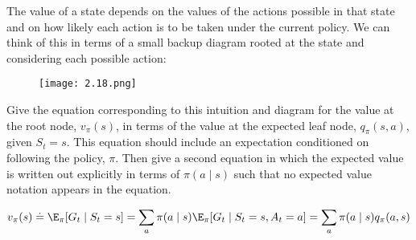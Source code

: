 
\begin{exercise}[Exercise 3.18]

The value of a state depends on the values of the actions possible in that state and on how likely each action is to be taken under the current policy.
We can think of this in terms of a small backup diagram rooted at the state and considering each possible action:

\begin{figure}[H]
    \centering
    \texttt{[image: 2.18.png]}
    \caption{}
    \label{fig:2.18}
\end{figure}

Give the equation corresponding to this intuition and diagram for the value at the root node, $v_\pi(s)$, in terms of the value at the expected leaf node, $q_\pi(s, a)$, given $S_t = s$.
This equation should include an expectation conditioned on following the policy, $\pi$.
Then give a second equation in which the expected value is written out explicitly in terms of $\pi(a \mid s)$ such that no expected value notation appears in the equation.

\end{exercise}


\begin{solution}

\begin{align*}
    v_\pi(s)
    \doteq
    \E_\pi[G_t \mid S_t = s]
    =
    \sum_a
        \pi(a \mid s)
        \E_\pi[G_t \mid S_t = s, A_t = a]
    =
    \sum_a
        \pi(a \mid s)
        q_\pi(a, s)
\end{align*}

\end{solution}

